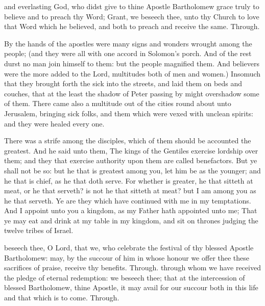 \collect
{} and everlasting God, who didst give to thine Apostle Bartholomew grace truly to believe and to preach thy Word; Grant, we beseech thee, unto thy Church to love that Word which he believed, and both to preach and receive the same. Through.

 By the hands of the apostles were many signs and wonders wrought among the people; (and they were all with one accord in Solomon's porch. And of the rest durst no man join himself to them: but the people magnified them. And believers were the more added to the Lord, multitudes both of men and women.) Insomuch that they brought forth the sick into the streets, and laid them on beds and couches, that at the least the shadow of Peter passing by might overshadow some of them. There came also a multitude out of the cities round about unto Jerusalem, bringing sick folks, and them which were vexed with unclean spirits: and they were healed every one.



 There was a strife among the disciples, which of them should be accounted the greatest. And he said unto them, The kings of the Gentiles exercise lordship over them; and they that exercise authority upon them are called benefactors. But ye shall not be so: but he that is greatest among you, let him be as the younger; and he that is chief, as he that doth serve. For whether is greater, he that sitteth at meat, or he that serveth? is not he that sitteth at meat? but I am among you as he that serveth. Ye are they which have continued with me in my temptations. And I appoint unto you a kingdom, as my Father hath appointed unto me; That ye may eat and drink at my table in my kingdom, and sit on thrones judging the twelve tribes of Israel.

\secret
{} beseech thee, O Lord, that we, who celebrate the festival of thy blessed Apostle Bartholomew: may, by the succour of him in whose honour we offer thee these sacrifices of praise, receive thy benefits. Through.
\postcommunion
{} through whom we have received the pledge of eternal redemption: we beseech thee; that at the intercession of blessed Bartholomew, thine Apostle, it may avail for our succour both in this life and that which is to come. Through.

